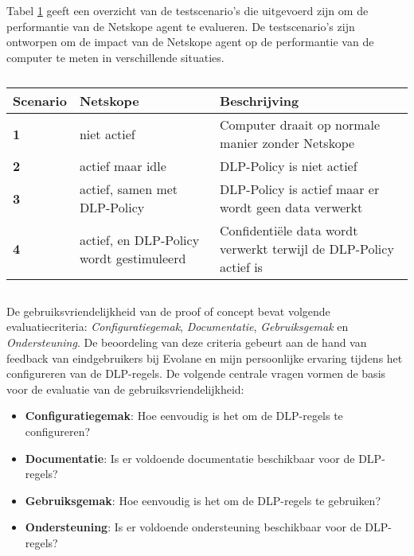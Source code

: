 Tabel \ref{tab:test-scenarios-performance} geeft een overzicht van de testscenario's die uitgevoerd zijn om de performantie van de Netskope agent te evalueren. 
De testscenario's zijn ontworpen om de impact van de Netskope agent op de performantie van de computer te meten in verschillende situaties. 

\begin{table}[h]
    \centering
    \small
    \scriptsize
    \begin{tabular}{p{1cm} p{5cm} p{8cm}}
        \toprule
        \textbf{Scenario} & \textbf{Netskope} & \textbf{Beschrijving} \\
        \midrule
        \textbf{1} & niet actief & Computer draait op normale manier zonder Netskope \\
        \textbf{2} & actief maar idle & DLP-Policy is niet actief \\
        \textbf{3} & actief, samen met DLP-Policy & DLP-Policy is actief maar er wordt geen data verwerkt \\
        \textbf{4} & actief, en DLP-Policy wordt gestimuleerd & Confidentiële data wordt verwerkt terwijl de DLP-Policy actief is \\
        \bottomrule
    \end{tabular}
    \caption{}
    \label{tab:test-scenarios-performance}
\end{table}


\subsection{}
\label{sec:gebruiksvriendelijkheid}

De gebruiksvriendelijkheid van de proof of concept bevat volgende evaluatiecriteria: 
\textit{Configuratiegemak}, \textit{Documentatie}, \textit{Gebruiksgemak} en \textit{Ondersteuning}. 
De beoordeling van deze criteria gebeurt aan de hand van feedback van eindgebruikers bij Evolane en mijn persoonlijke ervaring tijdens het configureren van de DLP-regels. 
De volgende centrale vragen vormen de basis voor de evaluatie van de gebruiksvriendelijkheid:

\begin{itemize}
    \item \textbf{Configuratiegemak}: Hoe eenvoudig is het om de DLP-regels te configureren?
    \item \textbf{Documentatie}: Is er voldoende documentatie beschikbaar voor de DLP-regels?
    \item \textbf{Gebruiksgemak}: Hoe eenvoudig is het om de DLP-regels te gebruiken?
    \item \textbf{Ondersteuning}: Is er voldoende ondersteuning beschikbaar voor de DLP-regels?
    \label{sec:gebruiksvriendelijkheid-criteria}
\end{itemize}

